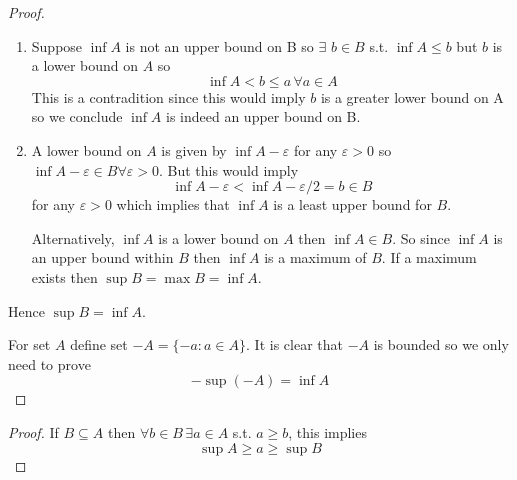 \begin{enumerate}[label=(\alph*)]
    \item 
    \begin{proof}
        \begin{enumerate}[label=(\roman*)]
            \item 
            Suppose $\inf A$ is not an upper bound on B so $\exists$ $b \in B$ s.t. $\inf A \leq b$ but $b$ is a lower bound on $A$ so
            \begin{equation*}
                \inf A < b \leq a \, \forall a \in  A
            \end{equation*}
            This is a contradition since this would imply $b$ is a greater lower
            bound on A so we conclude $\inf A$ is indeed an upper bound on B.

            \item 
            A lower bound on $A$ is given by $\inf A - \varepsilon$ for any $\varepsilon > 0$ so $\inf A - \varepsilon \in B \forall \varepsilon > 0$. 
            But this would imply
            \begin{equation*}
                \inf A - \varepsilon < \inf A - \varepsilon/2 = b \in B
            \end{equation*}
            for any $\varepsilon >0$ which implies that $\inf A$ is a least upper bound for $B$.

            Alternatively, $\inf A$ is a lower bound on $A$ then $\inf A \in B$.
            So since $\inf A$ is an upper bound within $B$ then $\inf A$ is a maximum of $B$. If a maximum exists then $\sup B = \max B = \inf A$.
        \end{enumerate}
        Hence $\sup B = \inf A$.

        \item
        For set $A$ define set $-A = \{-a : a \in  A \}$. It is clear that $-A$ is bounded so we only need to prove
        \begin{equation*}
            -\sup(-A) = \inf A
        \end{equation*}
    \end{proof}
\end{enumerate}

\begin{proof}
    If $B \subseteq A$ then $\forall b\in B \, \exists a \in  A$ s.t. $a \geq b$, this implies
    \begin{equation*}
        \sup A \geq a \geq \sup B
    \end{equation*}
\end{proof}

